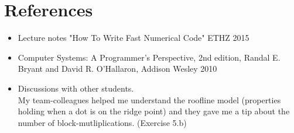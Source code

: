 \documentclass[10pt,a4paper,oneside,notitlepage]{report}
\begin{document}
\section*{References}
\begin{itemize}
\item Lecture notes "How To Write Fast Numerical Code" ETHZ 2015
\item Computer Systems: A Programmer's Perspective, 2nd edition,
Randal E. Bryant and David R. O'Hallaron, Addison Wesley 2010
\item Discussions with other students. \\My team-colleagues helped me understand the roofline model (properties holding when a dot is on the ridge point) and they gave me a tip about the number of block-mutliplications. (Exercise 5.b)
\end{itemize}
\end{document}
